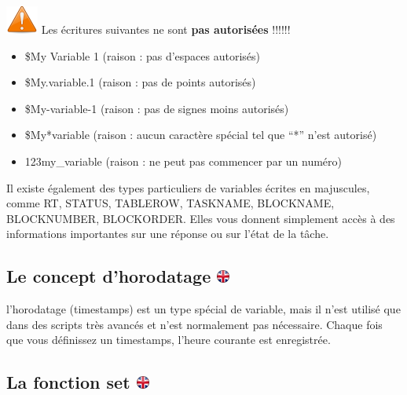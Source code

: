 \documentclass[
]{book}
\providecommand{\tightlist}{%
  \setlength{\itemsep}{0pt}\setlength{\parskip}{0pt}}
\begin{document}
\includegraphics{img/attention.png} Les écritures suivantes ne sont \textbf{pas autorisées} !!!!!!

\begin{itemize}
\tightlist
\item
  \$My Variable 1 (raison : pas d'espaces autorisés)
\item
  \$My.variable.1 (raison : pas de points autorisés)
\item
  \$My-variable-1 (raison : pas de signes moins autorisés)
\item
  \$My*variable (raison : aucun caractère spécial tel que ``*'' n'est autorisé)
\item
  123my\_variable (raison : ne peut pas commencer par un numéro)
\end{itemize}

Il existe également des types particuliers de variables écrites en majuscules, comme RT, STATUS, TABLEROW, TASKNAME, BLOCKNAME, BLOCKNUMBER, BLOCKORDER. Elles vous donnent simplement accès à des informations importantes sur une réponse ou sur l'état de la tâche.

\hypertarget{le-concept-dhorodatage}{%
\subsection[Le concept d'horodatage ]{\texorpdfstring{Le concept d'horodatage \href{https://www.psytoolkit.org/doc3.2.0/syntax.html\#timestamp}{\protect\includegraphics{img/ukflag.png}}}{Le concept d'horodatage }}\label{le-concept-dhorodatage}}

l'horodatage (timestamps) est un type spécial de variable, mais il n'est utilisé que dans des scripts très avancés et n'est normalement pas nécessaire. Chaque fois que vous définissez un timestamps, l'heure courante est enregistrée.

\hypertarget{la-fonction-set}{%
\subsection[La fonction set ]{\texorpdfstring{La fonction set \href{https://www.psytoolkit.org/doc3.2.0/syntax.html\#task-set}{\protect\includegraphics{img/ukflag.png}}}{La fonction set }}\label{la-fonction-set}}
\end{document}
